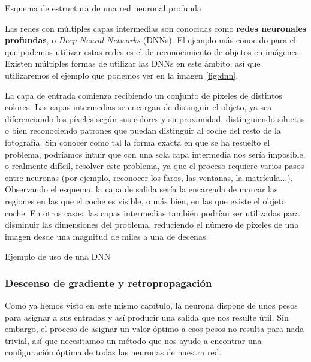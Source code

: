 %
       {Esquema de estructura de una red neuronal profunda}

Las redes con múltiples capas intermedias son conocidas como \textbf{redes neuronales profundas}, o \textit{Deep Neural Networks} (DNNs). El ejemplo más conocido para el que podemos utilizar estas redes es el de reconocimiento de objetos en imágenes. Existen múltiples formas de utilizar las DNNs en este ámbito, así que utilizaremos el ejemplo que podemos ver en la imagen \ref{fig:dnn}. 

La capa de entrada comienza recibiendo un conjunto de píxeles de distintos colores. Las capas intermedias se encargan de distinguir el objeto, ya sea diferenciando los píxeles según sus colores y su proximidad, distinguiendo siluetas o bien reconociendo patrones que puedan distinguir al coche del resto de la fotografía. Sin conocer como tal la forma exacta en que se ha resuelto el problema, podríamos intuir que con una sola capa intermedia nos sería imposible, o realmente difícil, resolver este problema, ya que el proceso requiere varios pasos entre neuronas (por ejemplo, reconocer los faros, las ventanas, la matrícula...). Observando el esquema, la capa de salida sería la encargada de marcar las regiones en las que el coche es visible, o más bien, en las que existe el objeto coche. En otros casos, las capas intermedias también podrían ser utilizadas para disminuir las dimensiones del problema, reduciendo el número de píxeles de una imagen desde una magnitud de miles a una de decenas.

%
       {Ejemplo de uso de una DNN \citep{NIPS2013_5207}}    

\subsubsection{Descenso de gradiente y retropropagación}

Como ya hemos visto en este mismo capítulo, la neurona dispone de unos pesos para asignar a sus entradas y así producir una salida que nos resulte útil. Sin embargo, el proceso de asignar un valor óptimo a esos pesos no resulta para nada trivial, así que necesitamos un método que nos ayude a encontrar una configuración óptima de todas las neuronas de nuestra red.
 
